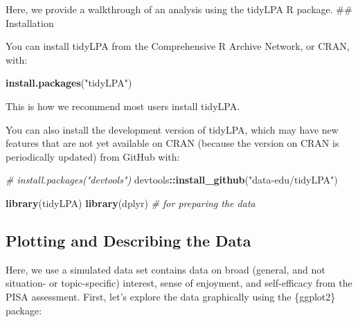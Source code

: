 \documentclass[english,man]{apa6}
\newenvironment{Shaded}{\begin{snugshade}}{\end{snugshade}}
\newcommand{\CommentTok}[1]{\textcolor[rgb]{0.56,0.35,0.01}{\textit{#1}}}
\newcommand{\DataTypeTok}[1]{\textcolor[rgb]{0.13,0.29,0.53}{#1}}
\newcommand{\KeywordTok}[1]{\textcolor[rgb]{0.13,0.29,0.53}{\textbf{#1}}}
\newcommand{\NormalTok}[1]{#1}
\newcommand{\OperatorTok}[1]{\textcolor[rgb]{0.81,0.36,0.00}{\textbf{#1}}}
\newcommand{\StringTok}[1]{\textcolor[rgb]{0.31,0.60,0.02}{#1}}
\begin{document}
Here, we provide a walkthrough of an analysis using the tidyLPA R package.
\#\# Installation

You can install tidyLPA from the Comprehensive R Archive Network, or CRAN, with:

\begin{Shaded}
\begin{Highlighting}[]
\KeywordTok{install.packages}\NormalTok{(}\StringTok{"tidyLPA"}\NormalTok{)}
\end{Highlighting}
\end{Shaded}

This is how we recommend most users install tidyLPA.

You can also install the development version of tidyLPA, which may have new
features that are not yet available on CRAN (because the version on CRAN is
periodically updated) from GitHub with:

\begin{Shaded}
\begin{Highlighting}[]
\CommentTok{# install.packages("devtools")}
\NormalTok{devtools}\OperatorTok{::}\KeywordTok{install_github}\NormalTok{(}\StringTok{"data-edu/tidyLPA"}\NormalTok{)}
\end{Highlighting}
\end{Shaded}

\begin{Shaded}
\begin{Highlighting}[]
\KeywordTok{library}\NormalTok{(tidyLPA)}
\KeywordTok{library}\NormalTok{(dplyr) }\CommentTok{# for preparing the data}
\end{Highlighting}
\end{Shaded}

\hypertarget{plotting-and-describing-the-data}{%
\subsection{Plotting and Describing the Data}\label{plotting-and-describing-the-data}}

Here, we use a simulated data set contains data on broad (general, and not situation- or topic-specific) interest, sense of enjoyment, and self-efficacy from the PISA assessment.
First, let's explore the data graphically using the \{ggplot2\} package:

\begin{Shaded}
\end{Shaded}
\end{document}
